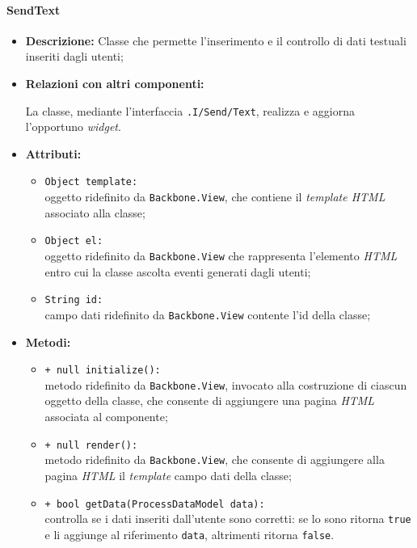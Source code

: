 \paragraph{SendText}
\label{sendText}
\begin{flushleft}
\begin{itemize}
\item \textbf{Descrizione:} Classe che permette l'inserimento e il controllo di dati testuali inseriti dagli utenti;
\item \textbf{Relazioni con altri componenti:}
\begin{sloppypar}
La classe, mediante l'interfaccia \texttt{\viewUser{}.I\fshyp{}Send\fshyp{}Text}, realizza e aggiorna l'opportuno \textit{widget}.
\end{sloppypar}
\item \textbf{Attributi:}
\begin{sloppypar}
\begin{itemize}
\item \texttt{Object template:}\\ oggetto ridefinito da \texttt{Backbone.View}, che contiene il \textit{template HTML} associato alla classe;
\item \texttt{Object el:}\\ oggetto ridefinito da \texttt{Backbone.View} che rappresenta l'elemento \textit{HTML} entro cui la classe ascolta eventi generati dagli utenti;
\item \texttt{String id:}\\ campo dati ridefinito da \texttt{Backbone.View} contente l'id della classe;
\end{itemize}
\end{sloppypar}
\item \textbf{Metodi:}
\begin{sloppypar}
\begin{itemize}
\item \texttt{+ null initialize():}\\ metodo ridefinito da \texttt{Backbone.View}, invocato alla costruzione di ciascun oggetto della classe, che consente di aggiungere una pagina \textit{HTML} associata al componente;
\item \texttt{+ null render():}\\ metodo ridefinito da \texttt{Backbone.View}, che consente di aggiungere alla pagina \textit{HTML} il \textit{template} campo dati della classe;
\item \texttt{+ bool getData(ProcessDataModel data):}\\ controlla se i dati inseriti dall'utente sono corretti: se lo sono ritorna \texttt{true} e li aggiunge al riferimento \texttt{data}, altrimenti ritorna \texttt{false}.
\end{itemize}
\end{sloppypar}
\end{itemize}
\end{flushleft}


